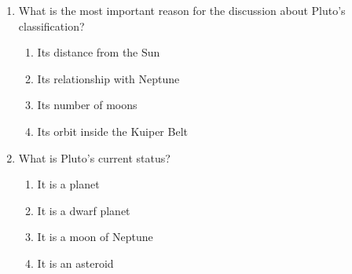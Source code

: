 \documentclass[12pt]{article}
\begin{document}
\begin{enumerate}
    \vspace{0.5cm}

    \item What is the most important reason for the discussion about Pluto's classification?

    \begin{enumerate}[label=\Alph*.]
        \item Its distance from the Sun
        \item Its relationship with Neptune
        \item Its number of moons
        \item Its orbit inside the Kuiper Belt
    \end{enumerate}
    
    \vspace{0.5cm}

    \item What is Pluto's current status?

    \begin{enumerate}[label=\Alph*.]
        \item It is a planet
        \item It is a dwarf planet
        \item It is a moon of Neptune
        \item It is an asteroid
    \end{enumerate}

\end{enumerate}
\end{document}
